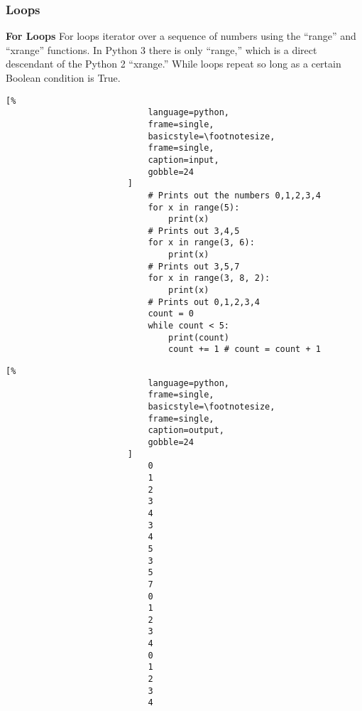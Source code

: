 \documentclass[crop=false,class=book,oneside]{standalone}
\begin{document}
            \subsubsection{Loops}
                \textbf{For Loops}
                    For loops iterator over a sequence of numbers using
                    the ``range'' and ``xrange'' functions. In Python 3
                    there is only ``range,'' which is a direct descendant
                    of the Python 2 ``xrange.'' While loops repeat so
                    long as a certain Boolean condition is True. \newline
                    \begin{minipage}[t]{.48\textwidth}
                        \centering
                        \begin{lstlisting}[%
                            language=python,
                            frame=single,
                            basicstyle=\footnotesize,
                            frame=single,
                            caption=input,
                            gobble=24
                        ]
                            # Prints out the numbers 0,1,2,3,4
                            for x in range(5):
                                print(x)
                            # Prints out 3,4,5
                            for x in range(3, 6):
                                print(x)
                            # Prints out 3,5,7
                            for x in range(3, 8, 2):
                                print(x)
                            # Prints out 0,1,2,3,4
                            count = 0
                            while count < 5:
                                print(count)
                                count += 1 # count = count + 1
                        \end{lstlisting}
                    \end{minipage}\hfill
                    \begin{minipage}[t]{.48\textwidth}
                        \centering
                        \begin{lstlisting}[%
                            language=python,
                            frame=single,
                            basicstyle=\footnotesize,
                            frame=single,
                            caption=output,
                            gobble=24
                        ]
                            0
                            1
                            2
                            3
                            4
                            3
                            4
                            5
                            3
                            5
                            7
                            0
                            1
                            2
                            3
                            4
                            0
                            1
                            2
                            3
                            4
                        \end{lstlisting}
                    \end{minipage}
\end{document}
